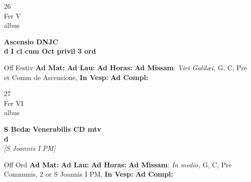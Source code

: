 \documentclass[10pt, openany]{book}
\begin{document}
        \begin{center}
            \begin{minipage}{3.5in}
                \vspace{2em}
                \begin{minipage}{0.5in}
                    {\Huge 26} \\
                    {\normalsize Fer V} \\
                    {\normalsize albus}
                \end{minipage}
                \begin{minipage}{3.0in}
                    \textbf{ \large Ascensio DNJC \\
                    \textnormal{\normalsize d I cl cum Oct privil 3 ord}} \\ 
                \end{minipage}
                \begin{justify}Off Festiv
                    \textbf{Ad Mat: }
                    \textbf{Ad Lau: }
                    \textbf{Ad Horas: }\textbf{Ad Missam}: \textit{Viri Galilæi,} G, C, Pre et Comm de Ascensione,  
                    \textbf{In Vesp: }
                    \textbf{Ad Compl: }
                \end{justify}
            \end{minipage}
        \end{center}
    
        \begin{center}
            \begin{minipage}{3.5in}
                \vspace{2em}
                \begin{minipage}{0.5in}
                    {\Huge 27} \\
                    {\normalsize Fer VI} \\
                    {\normalsize albus}
                \end{minipage}
                \begin{minipage}{3.0in}
                    \textbf{ \large S Bedæ Venerabilis CD mtv \\
                    \textnormal{\normalsize d}} \\ \textit{[S Joannis I PM]} \\ 
                \end{minipage}
                \begin{justify}Off Ord
                    \textbf{Ad Mat: }
                    \textbf{Ad Lau: }
                    \textbf{Ad Horas: }\textbf{Ad Missam}: \textit{In medio,} G, C, Pre Communis, 2 or S Joannis I PM,  
                    \textbf{In Vesp: }
                    \textbf{Ad Compl: }
                \end{justify}
            \end{minipage}
        \end{center}
    
\end{document}
